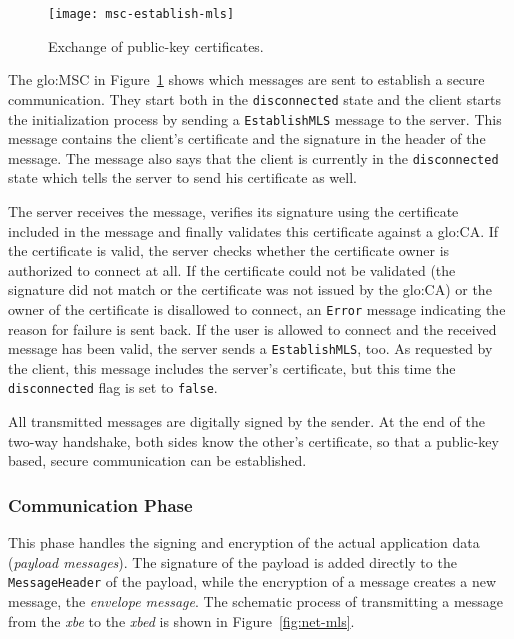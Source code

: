 \begin{figure}[ht]
  \centering
  \texttt{[image: msc-establish-mls]}
  \caption[MSC    Message   Layer    Security]{Exchange    of   public-key
    certificates.}
  \label{fig:msc-establish-mls}
\end{figure}

The   \gls{glo:MSC}  in  Figure~\ref{fig:msc-establish-mls}   shows  which
messages are sent to establish  a secure communication. They start both in
the \texttt{disconnected}  state and the client  starts the initialization
process  by sending a  \texttt{EstablishMLS} message  to the  server. This
message contains the client's certificate  and the signature in the header
of the message.  The message also says that the client is currently in the
\texttt{disconnected} state which tells the server to send his certificate
as well.

The  server  receives  the  message,  verifies  its  signature  using  the
certificate included in the message and finally validates this certificate
against a  \gls{glo:CA}. If  the certificate is  valid, the  server checks
whether the  certificate owner  is authorized to  connect at all.   If the
certificate could not be validated (\ie the signature did not match or the
certificate  was not  issued  by the  \gls{glo:CA})  or the  owner of  the
certificate is disallowed to connect, an \texttt{Error} message indicating
the reason for failure is sent back. If the user is allowed to connect and
the   received   message   has    been   valid,   the   server   sends   a
\texttt{EstablishMLS},  too.  As  requested  by the  client, this  message
includes the server's certificate, but this time the \texttt{disconnected}
flag is set to \texttt{false}.

All transmitted messages are digitally signed by the sender. At the end of
the two-way handshake, both sides  know the other's certificate, so that a
public-key based, secure communication can be established.

\subsubsection{Communication Phase}

This phase  handles the signing  and encryption of the  actual application
data  (\emph{payload messages}).  The  signature of  the payload  is added
directly  to   the  \texttt{MessageHeader}  of  the   payload,  while  the
encryption  of  a  message  creates  a  new  message,  the  \emph{envelope
  message}.   The schematic  process of  transmitting a  message  from the
\emph{xbe} to the \emph{xbed} is shown in Figure~\ref{fig:net-mls}.
 
